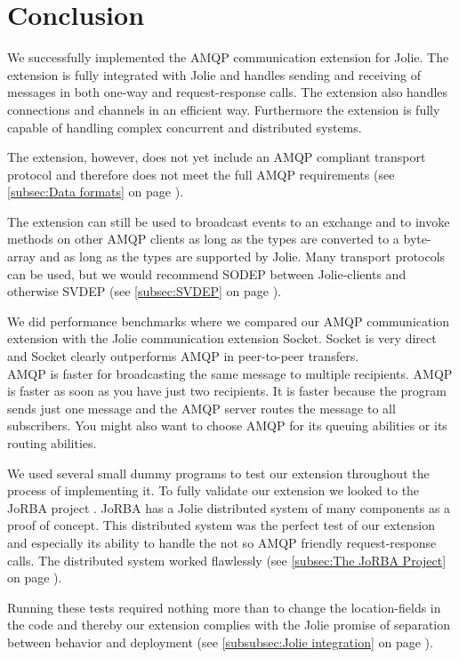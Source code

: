 \section{Conclusion}
We successfully implemented the AMQP communication extension for Jolie. The extension is fully integrated with Jolie and handles sending and receiving of messages in both one-way and request-response calls. The extension also handles connections and channels in an efficient way. Furthermore the extension is fully capable of handling complex concurrent and distributed systems.

The extension, however, does not yet include an AMQP compliant transport protocol and therefore does not meet the full AMQP requirements (see \ref{subsec:Data formats} on page \pageref{subsec:Data formats}).

The extension can still be used to broadcast events to an exchange and to invoke methods on other AMQP clients as long as the types are converted to a byte-array and as long as the types are supported by Jolie. Many transport protocols can be used, but we would recommend SODEP between Jolie-clients and otherwise SVDEP (see \ref{subsec:SVDEP} on page \pageref{subsec:SVDEP}).

We did performance benchmarks where we compared our AMQP communication extension with the Jolie communication extension Socket. Socket is very direct and Socket clearly outperforms AMQP in peer-to-peer transfers.\\
AMQP is faster for broadcasting the same message to multiple recipients. AMQP is faster as soon as you have just two recipients. It is faster because the program sends just one message and the AMQP server routes the message to all subscribers. You might also want to choose AMQP for its queuing abilities or its routing abilities.

We used several small dummy programs to test our extension throughout the process of implementing it. To fully validate our extension we looked to the JoRBA project \cite{Jorba}. JoRBA has a Jolie distributed system of many components as a proof of concept. This distributed system was the perfect test of our extension and especially its ability to handle the not so AMQP friendly request-response calls. The distributed system worked flawlessly (see \ref{subsec:The JoRBA Project} on page \pageref{subsec:The JoRBA Project}).

Running these tests required nothing more than to change the location-fields in the code and thereby our extension complies with the Jolie promise of separation between behavior and deployment (see \ref{subsubsec:Jolie integration} on page \pageref{subsubsec:Jolie integration}).
